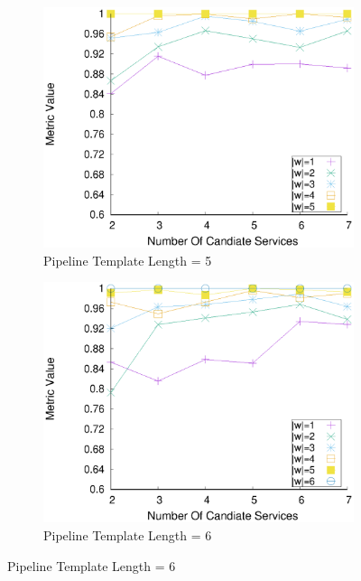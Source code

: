 \begin{figure}[ht!]
\begin{subfigure}{0.49\textwidth}
        \label{fig:quality_window_average_perce_n4}
      \end{subfigure}
      \hfill
      \begin{subfigure}{0.49\textwidth}
        \includegraphics[width=\textwidth]{Images/graphs/window_quality_performance_diff_perce_n7_s7_50_89_n5}
        \caption{Pipeline Template Length = 5}
        \label{fig:quality_window_average_perce_n5}
      \end{subfigure}
      \hfill
      \begin{subfigure}{0.49\textwidth}
        \includegraphics[width=\textwidth]{Images/graphs/window_quality_performance_diff_perce_n7_s7_50_89_n6}
        \caption{Pipeline Template Length = 6}

\end{subfigure}
\end{figure}
